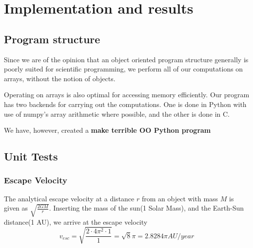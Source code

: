 \documentclass[a4paper]{article}
\begin{document}






\section{Implementation and results}\label{sec:implementation_and_results}
\subsection{Program structure}
Since we are of the opinion that an object oriented program structure generally is poorly suited for scientific programming, we perform all of our computations on arrays, without the notion of objects.

Operating on arrays is also optimal for accessing memory efficiently. Our program has two backends for carrying out the computations. One is done in Python with use of numpy's array arithmetic where possible, and the other is done in C.

We have, however, created a \textbf{make terrible OO Python program}

\subsection{Unit Tests}
\subsubsection{Escape Velocity}
The analytical escape velocity at a distance $r$ from an object with mass $M$ is given as $\sqrt{\frac{2GM}{r}}$. Inserting the mass of the sun(1 Solar Mass), and the Earth-Sun distance(1 AU), we arrive at the escape velocity
\begin{equation}
v_{esc} = \sqrt{\frac{2\cdot 4\pi^2 \cdot 1}{1}} = \sqrt{8}\pi = 2.8284\pi AU/year
\end{equation}
\end{document}

